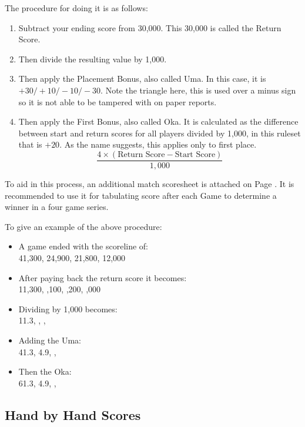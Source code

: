 The procedure for doing it is as follows:
\begin{enumerate}
	\item Subtract your ending score from 30,000. This 30,000 is called the Return Score.
	\item Then divide the resulting value by 1,000.
	\item Then apply the Placement Bonus, also called Uma. In this case, it is \(+30/+10/\minus10/\minus30\). Note the triangle here, this is used over a minus sign so it is not able to be tampered with on paper reports.
	\item Then apply the First Bonus, also called Oka. It is calculated as the difference between start and return scores for all players divided by 1,000, in this ruleset that is \(+20\). As the name suggests, this applies only to first place.
	\[\frac{4\times(\text{Return Score} - \text{Start Score})}{1,000}\]	
\end{enumerate}

To aid in this process, an additional match scoresheet is attached on Page \pageref{\rulesetprefix:fig:match}. It is recommended to use it for tabulating score after each Game to determine a winner in a four game series.

To give an example of the above procedure:
\begin{itemize}
	\item A game ended with the scoreline of: \\ 41,300, 24,900, 21,800, 12,000
	\item After paying back the return score it becomes: \\ 11,300, ,100, ,200, ,000
	\item Dividing by 1,000 becomes: \\ 11.3, , , 
	\item Adding the Uma: \\ 41.3, 4.9, , 
	\item Then the Oka: \\ 61.3, 4.9, , 
\end{itemize}



\subsection{Hand by Hand Scores}\label{core:ssec:hand-scores}

